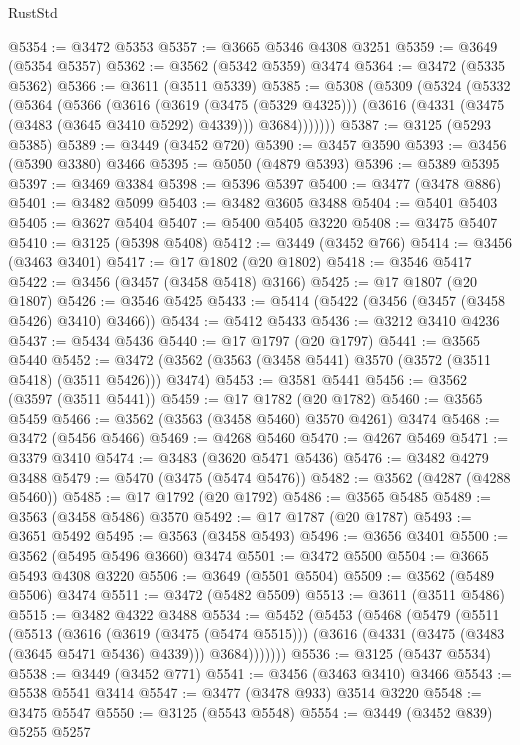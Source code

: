 \begin{lexlean}{RustStd}
\begin{coremodule}
{\begin{coremodule}
{{{{{{{{{{{{{{{{{{{{{{{{{{{{{{{{{{{{{{{{{{{{{@5354 := @3472 @5353
@5357 := @3665 @5346 @4308 @3251
@5359 := @3649 (@5354 @5357)
@5362 := @3562 (@5342 @5359) @3474
@5364 := @3472 (@5335 @5362)
@5366 := @3611 (@3511 @5339)
@5385 := @5308
    (@5309
      (@5324
        (@5332
          (@5364
            (@5366
              (@3616
                (@3619 (@3475 (@5329 @4325)))
                (@3616 (@4331 (@3475 (@3483 (@3645 @3410 @5292) @4339))) @3684)))))))
@5387 := @3125 (@5293 @5385)
@5389 := @3449 (@3452 @720)
@5390 := @3457 @3590
@5393 := @3456 (@5390 @3380) @3466
@5395 := @5050 (@4879 @5393)
@5396 := @5389 @5395
@5397 := @3469 @3384
@5398 := @5396 @5397
@5400 := @3477 (@3478 @886)
@5401 := @3482 @5099
@5403 := @3482 @3605 @3488
@5404 := @5401 @5403
@5405 := @3627 @5404
@5407 := @5400 @5405 @3220
@5408 := @3475 @5407
@5410 := @3125 (@5398 @5408)
@5412 := @3449 (@3452 @766)
@5414 := @3456 (@3463 @3401)
@5417 := @17 @1802 (@20 @1802)
@5418 := @3546 @5417
@5422 := @3456 (@3457 (@3458 @5418) @3166)
@5425 := @17 @1807 (@20 @1807)
@5426 := @3546 @5425
@5433 := @5414 (@5422 (@3456 (@3457 (@3458 @5426) @3410) @3466))
@5434 := @5412 @5433
@5436 := @3212 @3410 @4236
@5437 := @5434 @5436
@5440 := @17 @1797 (@20 @1797)
@5441 := @3565 @5440
@5452 := @3472 (@3562 (@3563 (@3458 @5441) @3570 (@3572 (@3511 @5418) (@3511 @5426))) @3474)
@5453 := @3581 @5441
@5456 := @3562 (@3597 (@3511 @5441))
@5459 := @17 @1782 (@20 @1782)
@5460 := @3565 @5459
@5466 := @3562 (@3563 (@3458 @5460) @3570 @4261) @3474
@5468 := @3472 (@5456 @5466)
@5469 := @4268 @5460
@5470 := @4267 @5469
@5471 := @3379 @3410
@5474 := @3483 (@3620 @5471 @5436)
@5476 := @3482 @4279 @3488
@5479 := @5470 (@3475 (@5474 @5476))
@5482 := @3562 (@4287 (@4288 @5460))
@5485 := @17 @1792 (@20 @1792)
@5486 := @3565 @5485
@5489 := @3563 (@3458 @5486) @3570
@5492 := @17 @1787 (@20 @1787)
@5493 := @3651 @5492
@5495 := @3563 (@3458 @5493)
@5496 := @3656 @3401
@5500 := @3562 (@5495 @5496 @3660) @3474
@5501 := @3472 @5500
@5504 := @3665 @5493 @4308 @3220
@5506 := @3649 (@5501 @5504)
@5509 := @3562 (@5489 @5506) @3474
@5511 := @3472 (@5482 @5509)
@5513 := @3611 (@3511 @5486)
@5515 := @3482 @4322 @3488
@5534 := @5452
    (@5453
      (@5468
        (@5479
          (@5511
            (@5513
              (@3616
                (@3619 (@3475 (@5474 @5515)))
                (@3616 (@4331 (@3475 (@3483 (@3645 @5471 @5436) @4339))) @3684)))))))
@5536 := @3125 (@5437 @5534)
@5538 := @3449 (@3452 @771)
@5541 := @3456 (@3463 @3410) @3466
@5543 := @5538 @5541 @3414
@5547 := @3477 (@3478 @933) @3514 @3220
@5548 := @3475 @5547
@5550 := @3125 (@5543 @5548)
@5554 := @3449 (@3452 @839) @5255 @5257
}}}}}}}}}}}}}}}}}}}}}}}}}}}}}}}}}}}}}}}}}}}}}
\end{coremodule}}
\end{coremodule}
\end{lexlean}
